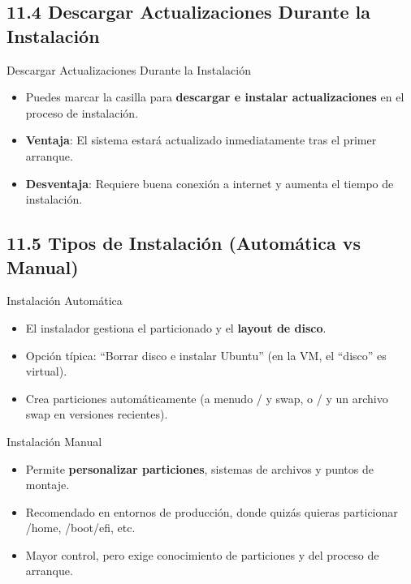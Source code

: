 \documentclass{beamer}
\begin{document}
\subsection{11.4 Descargar Actualizaciones Durante la Instalación}
\begin{frame}{Descargar Actualizaciones Durante la Instalación}
	\begin{itemize}
		\item Puedes marcar la casilla para \textbf{descargar e instalar actualizaciones} en el proceso de instalación.
		\item \textbf{Ventaja}: El sistema estará actualizado inmediatamente tras el primer arranque.
		\item \textbf{Desventaja}: Requiere buena conexión a internet y aumenta el tiempo de instalación.
	\end{itemize}
\end{frame}

\subsection{11.5 Tipos de Instalación (Automática vs Manual)}
\begin{frame}{Instalación Automática}
	\begin{itemize}
		\item El instalador gestiona el particionado y el \textbf{layout de disco}.
		\item Opción típica: “Borrar disco e instalar Ubuntu” (en la VM, el “disco” es virtual).
		\item Crea particiones automáticamente (a menudo / y swap, o / y un archivo swap en versiones recientes).
	\end{itemize}
\end{frame}

\begin{frame}{Instalación Manual}
	\begin{itemize}
		\item Permite \textbf{personalizar particiones}, sistemas de archivos y puntos de montaje.
		\item Recomendado en entornos de producción, donde quizás quieras particionar /home, /boot/efi, etc.
		\item Mayor control, pero exige conocimiento de particiones y del proceso de arranque.
	\end{itemize}
\end{frame}
\end{document}
